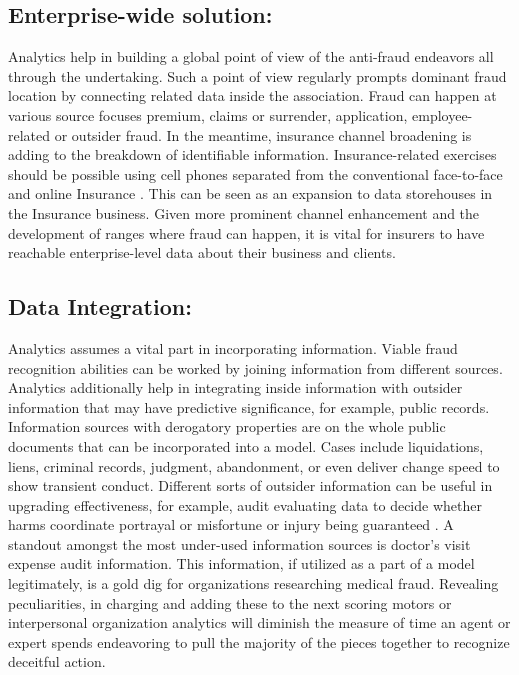 \documentclass[sigconf]{acmart}
\begin{document}
\subsection{Enterprise-wide solution:}

Analytics help in building a global point of view of the anti-fraud endeavors all through the undertaking. Such a point of view regularly prompts dominant fraud location by connecting related data inside the association. Fraud can happen at various source focuses premium, claims or surrender, application, employee-related or outsider fraud. In the meantime, insurance channel broadening is adding to the breakdown of identifiable information. Insurance-related exercises should be possible using cell phones separated from the conventional face-to-face and online Insurance \cite{18,1}. This can be seen as an expansion to data storehouses in the Insurance business. Given more prominent channel enhancement and the development of ranges where fraud can happen, it is vital for insurers to have reachable enterprise-level data about their business and clients. 

\subsection{Data Integration:}

Analytics assumes a vital part in incorporating information. Viable fraud recognition abilities can be worked by joining information from different sources. Analytics additionally help in integrating inside information with outsider information that may have predictive significance, for example, public records. Information sources with derogatory properties are on the whole public documents that can be incorporated into a model. Cases include liquidations, liens, criminal records, judgment, abandonment, or even deliver change speed to show transient conduct. Different sorts of outsider information can be useful in upgrading effectiveness, for example, audit evaluating data to decide whether harms coordinate portrayal or misfortune or injury being guaranteed \cite{16}. A standout amongst the most under-used information sources is doctor's visit expense audit information. This information, if utilized as a part of a model legitimately, is a gold dig for organizations researching medical fraud. Revealing peculiarities, in charging and adding these to the next scoring motors or interpersonal organization analytics will diminish the measure of time an agent or expert spends endeavoring to pull the majority of the pieces together to recognize deceitful action. 
\end{document}
